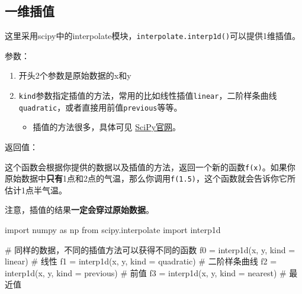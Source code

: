 \documentclass[
  letterpaper,
  DIV=11,
  numbers=noendperiod]{scrreprt}
\newenvironment{Shaded}{\begin{snugshade}}{\end{snugshade}}
\newcommand{\CommentTok}[1]{\textcolor[rgb]{0.37,0.37,0.37}{#1}}
\newcommand{\ImportTok}[1]{\textcolor[rgb]{0.00,0.46,0.62}{#1}}
\newcommand{\NormalTok}[1]{\textcolor[rgb]{0.00,0.23,0.31}{#1}}
\newcommand{\OperatorTok}[1]{\textcolor[rgb]{0.37,0.37,0.37}{#1}}
\newcommand{\StringTok}[1]{\textcolor[rgb]{0.13,0.47,0.30}{#1}}
\providecommand{\tightlist}{%
  \setlength{\itemsep}{0pt}\setlength{\parskip}{0pt}}\usepackage{longtable,booktabs,array}
\begin{document}
\hypertarget{ux4e00ux7ef4ux63d2ux503c}{%
\subsection{一维插值}\label{ux4e00ux7ef4ux63d2ux503c}}

这里采用scipy中的interpolate模块，\texttt{interpolate.interp1d()}可以提供1维插值。

参数：

\begin{enumerate}
\def\labelenumi{\arabic{enumi}.}
\tightlist
\item
  开头2个参数是原始数据的x和y
\item
  \texttt{kind}参数指定插值的方法，常用的比如线性插值\texttt{linear}，二阶样条曲线\texttt{quadratic}，或者直接用前值\texttt{previous}等等。

  \begin{itemize}
  \tightlist
  \item
    插值的方法很多，具体可见
    \href{https://docs.scipy.org/doc/scipy/reference/generated/scipy.interpolate.interp1d.html}{SciPy官网}。
  \end{itemize}
\end{enumerate}

返回值：

这个函数会根据你提供的数据以及插值的方法，返回一个新的函数\texttt{f(x)}。如果你原始数据中\textbf{只有}1点和2点的气温，那么你调用\texttt{f(1.5)}，这个函数就会告诉你它所估计1点半气温。

注意，插值的结果\textbf{一定会穿过原始数据}。

\begin{Shaded}
\begin{Highlighting}[]
\ImportTok{import}\NormalTok{ numpy }\ImportTok{as}\NormalTok{ np}
\ImportTok{from}\NormalTok{ scipy.interpolate }\ImportTok{import}\NormalTok{ interp1d}

\CommentTok{\# 同样的数据，不同的插值方法可以获得不同的函数}
\NormalTok{f0 }\OperatorTok{=}\NormalTok{ interp1d(x, y, kind }\OperatorTok{=} \StringTok{\textquotesingle{}linear\textquotesingle{}}\NormalTok{) }\CommentTok{\# 线性}
\NormalTok{f1 }\OperatorTok{=}\NormalTok{ interp1d(x, y, kind }\OperatorTok{=} \StringTok{\textquotesingle{}quadratic\textquotesingle{}}\NormalTok{) }\CommentTok{\# 二阶样条曲线}
\NormalTok{f2 }\OperatorTok{=}\NormalTok{ interp1d(x, y, kind }\OperatorTok{=} \StringTok{\textquotesingle{}previous\textquotesingle{}}\NormalTok{) }\CommentTok{\# 前值}
\NormalTok{f3 }\OperatorTok{=}\NormalTok{ interp1d(x, y, kind }\OperatorTok{=} \StringTok{\textquotesingle{}nearest\textquotesingle{}}\NormalTok{) }\CommentTok{\# 最近值}
\end{Highlighting}
\end{Shaded}
\end{document}
